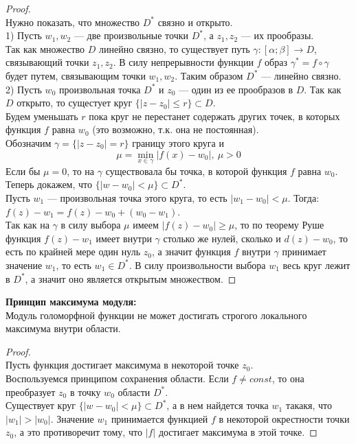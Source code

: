 \begin{proof}
    \ \\
    Нужно показать, что множество $D^*$ связно и открыто.\\
    1) Пусть $w_1, w_2$ --- две произвольные точки $D^*$, а $z_1, z_2$ --- их прообразы.\\
    Так как множество $D$ линейно связно, то существует путь $\gamma: [\alpha; \beta]\rightarrow D$, связывающий точки $z_1, z_2$. В силу непрерывности функции $f$ образ $\gamma^*=f\circ \gamma$ будет путем, связывающим точки $w_1, w_2$. Таким образом $D^*$ --- линейно связно.\\[2mm]
    2) Пусть $w_0$ произвольная точка $D^*$ и $z_0$ --- один из ее прообразов в $D$. Так как $D$ открыто, то сущестует круг $\{|z-z_0|\leq r\}\subset D$. \\
    Будем уменьшать $r$ пока круг не перестанет содержать других точек, в которых функция $f$ равна $w_0$ (это возможно, т.к. она не постоянная).\\
    Обозначим $\gamma=\{|z-z_0|=r\}$ границу этого круга и
    $$\mu=\underset{x\in \gamma}{\min}|f(x)-w_0|, \ \mu>0$$
    Если бы $\mu =0$, то на $\gamma$ существовала бы точка, в которой функция $f$ равна $w_0$.\\[2mm]
    Теперь докажем, что $\{|w-w_0|<\mu\} \subset D^*$.\\
    Пусть $w_1$ --- произвольная точка этого круга, то есть $|w_1-w_0|<\mu$. Тогда:\\
    $f(z)-w_1=f(z)-w_0+(w_0-w_1)$.\\
    Так как на $\gamma$ в силу выбора $\mu$ имеем $|f(z)-w_0|\geq \mu$, то по теорему Руше функция $f(z)-w_1$ имеет внутри $\gamma$ столько же нулей, сколько и $d(z)-w_0$, то есть по крайней мере один нуль $z_0$, а значит функция $f$ внутри $\gamma$ принимает значение $w_1$, то есть $w_1 \in D^*$. В силу произвольности выбора $w_1$ весь круг лежит в $D^*$, а значит оно является открытым множеством.
\end{proof}


\textbf{Принцип максимума модуля:}\\[2mm]
Модуль голоморфной функции не может достигать строгого локального максимума внутри области.\\[2mm]
\begin{proof}
    \ \\
    Пусть функция достигает максимума в некоторой точке $z_0$.\\
    Воспользуемся принципом сохранения области. Если $f\neq const$, то она преобразует $z_0$ в точку $w_0$ области $D^*$. \\
    Существует круг $\{|w-w_0|<\mu\}\subset D^*$, а в нем найдется точка $w_1$ такакя, что  $|w_1|> |w_0|$. Значение $w_1$ принимается функцией $f$ в некоторой окрестности точки $z_0$, а это противоречит тому, что $|f|$ достигает максимума в этой точке.
\end{proof}
